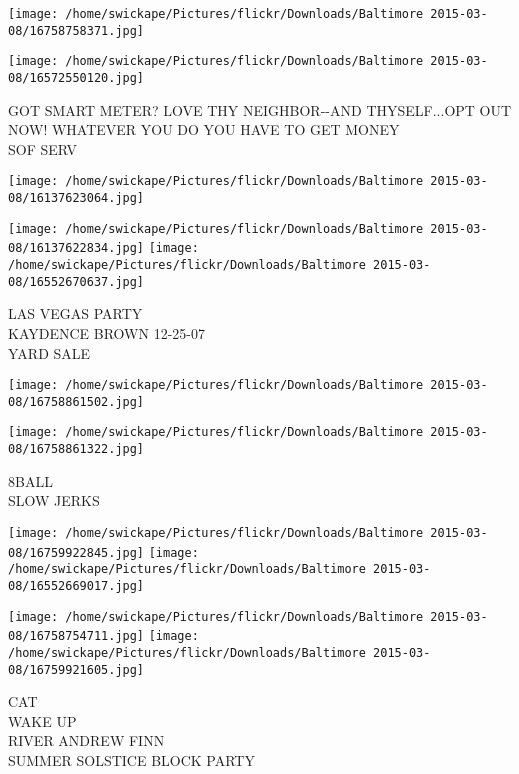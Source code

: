 \documentclass[10pt,letterpaper]{article}
\begin{document}
\texttt{[image: /home/swickape/Pictures/flickr/Downloads/Baltimore 2015-03-08/16758758371.jpg]}

\vspace{0.25in}
\texttt{[image: /home/swickape/Pictures/flickr/Downloads/Baltimore 2015-03-08/16572550120.jpg]}

GOT SMART METER? LOVE THY NEIGHBOR{-}{-}AND THYSELF...OPT OUT NOW!  WHATEVER YOU DO YOU HAVE TO GET MONEY\\
SOF SERV\\
\pagebreak

\texttt{[image: /home/swickape/Pictures/flickr/Downloads/Baltimore 2015-03-08/16137623064.jpg]}

\vspace{0.25in}
\texttt{[image: /home/swickape/Pictures/flickr/Downloads/Baltimore 2015-03-08/16137622834.jpg]}
\texttt{[image: /home/swickape/Pictures/flickr/Downloads/Baltimore 2015-03-08/16552670637.jpg]}

LAS VEGAS PARTY\\
KAYDENCE BROWN 12{-}25{-}07\\
YARD SALE\\
\pagebreak

\texttt{[image: /home/swickape/Pictures/flickr/Downloads/Baltimore 2015-03-08/16758861502.jpg]}

\vspace{0.25in}
\texttt{[image: /home/swickape/Pictures/flickr/Downloads/Baltimore 2015-03-08/16758861322.jpg]}

8BALL\\
SLOW JERKS\\
\pagebreak

\texttt{[image: /home/swickape/Pictures/flickr/Downloads/Baltimore 2015-03-08/16759922845.jpg]}
\texttt{[image: /home/swickape/Pictures/flickr/Downloads/Baltimore 2015-03-08/16552669017.jpg]}

\texttt{[image: /home/swickape/Pictures/flickr/Downloads/Baltimore 2015-03-08/16758754711.jpg]}
\texttt{[image: /home/swickape/Pictures/flickr/Downloads/Baltimore 2015-03-08/16759921605.jpg]}

CAT\\
WAKE UP\\
RIVER ANDREW FINN\\
SUMMER SOLSTICE BLOCK PARTY\\
\pagebreak
\end{document}
